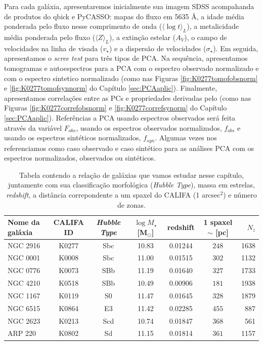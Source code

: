 Para cada galáxia, apresentaremos inicialmente sua imagem SDSS acompahanda de produtos do {\sc qbick} e PyCASSO: mapas
do fluxo em 5635 \AA, a idade média ponderada pelo fluxo nesse comprimento de onda ($\langle \log t \rangle_L$), a
metalicidade média ponderada pelo fluxo ($\langle Z \rangle_L$), a extinção estelar ($A_V$), o campo de velocidades na
linha de visada ($v_\star$) e a dispersão de velocidades ($\sigma_\star$). Em seguida, apresentamos o {\em scree test}
para três tipos de PCA. Na sequência, apresentamos tomogramas e autoespectros para a PCA com o espectro observado
normalizado e com o espectro sintetico normalizado (como nas Figuras \ref{fig:K0277tomofobsnorm} e
\ref{fig:K0277tomofsynnorm} do Capítulo \ref{sec:PCAaplic}). Finalmente, apresentamos correlações entre as PCs e
propriedades derivadas pelo \starlight (como nas Figuras \ref{fig:K0277correfobsnorm} e \ref{fig:K0277correfsynorm} do
Capítulo \ref{sec:PCAaplic}). Referências a PCA usando espectros observados será feita através da variável $F_{obs}$,
usando os espectros observados normalizados, $f_{obs}$ e usando os espectros sintéticos normalizados, $f_{syn}$. Algumas
vezes nos referenciamos como caso observado e caso sintético para as análises PCA com os espectros normalizados,
observados ou sintéticos.

\begin{table}
	\caption[Relação de galáxias do CALIFA usadas neste trabalho.]
	{Tabela contendo a relação de galáxias que vamos estudar nesse capítulo, juntamente com sua classificação morfológica
	({\em Hubble Type}), massa em estrelas, {\em redshift}, a distância correpondente a um spaxel do CALIFA
	(1 arcsec$^2$) e número de zonas.}
	\begin{tabular}{l c c c c c r}
		Nome da galáxia & CALIFA ID & {\em Hubble Type} & $\log M_\star$ [M$_\odot$] & redshift & 1 spaxel $\sim$ [pc] &
		$N_z$ \\
		\midrule
		NGC 2916 & K0277 & Sbc & 10.83 & 0.01244 & $248$ & 1638 \\
		NGC 0001 & K0008 & Sbc & 11.00 & 0.01515 & $302$ & 1132 \\
		NGC 0776 & K0073 & SBb & 11.19 & 0.01640 & $327$ & 1733 \\
		NGC 4210 & K0518 & SBb & 10.49 & 0.00906 & $181$ & 1938 \\
		NGC 1167 & K0119 & S0  & 11.47 & 0.01645 & $328$ & 1879 \\
		NGC 6515 & K0864 & E3  & 11.42 & 0.02285 & $455$ & 887  \\
		NGC 2623 & K0213 & Scd & 10.74 & 0.01847 & $368$ & 561  \\
		ARP 220  & K0802 & Sd  & 11.15 & 0.01814 & $361$ & 1157 \\
	\end{tabular}
	\label{tab:amostraGalaxias}
\end{table}

